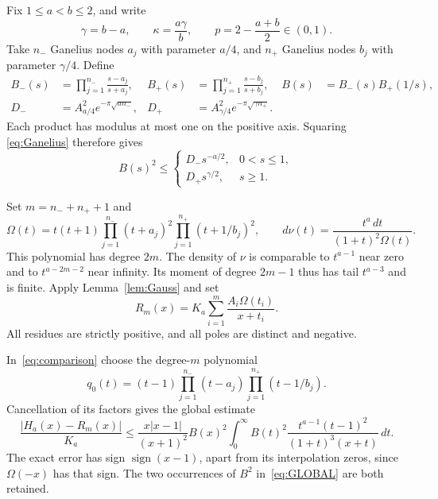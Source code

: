 \documentclass[11pt]{article}
\numberwithin{equation}{section}
\begin{document}
Fix $1\le a<b\le2$, and write
\[
 \gamma=b-a,\qquad \kappa=\frac{a\gamma}{b},\qquad
 p=2-\frac{a+b}{2}\in(0,1).
\]
Take $n_-$ Ganelius nodes $a_j$ with parameter $a/4$, and $n_+$
Ganelius nodes $b_j$ with parameter $\gamma/4$. Define
\begin{align}\label{eq:Bcombined}
 B_-(s)&=\prod_{j=1}^{n_-}\frac{s-a_j}{s+a_j},&
 B_+(s)&=\prod_{j=1}^{n_+}\frac{s-b_j}{s+b_j},&
 B(s)&=B_-(s)B_+(1/s),\\
 D_-&=A_{a/4}^2e^{-\pi\sqrt{a n_-}},&
 D_+&=A_{\gamma/4}^2e^{-\pi\sqrt{\gamma n_+}}.\nonumber
\end{align}
Each product has modulus at most one on the positive axis. Squaring
\eqref{eq:Ganelius} therefore gives
\begin{equation}\label{eq:envelopes}
 B(s)^2\le
 \begin{cases}D_-s^{-a/2},&0<s\le1,\\
 D_+s^{\gamma/2},&s\ge1.
 \end{cases}
\end{equation}

Set $m=n_-+n_++1$ and
\begin{equation}\label{eq:OmegaC1}
 \Omega(t)=t(t+1)\prod_{j=1}^{n_-}(t+a_j)^2
                         \prod_{j=1}^{n_+}(t+1/b_j)^2,
 \qquad d\nu(t)=\frac{t^a\,dt}{(1+t)^2\Omega(t)}.
\end{equation}
This polynomial has degree $2m$. The density of $\nu$ is comparable
to $t^{a-1}$ near zero and to $t^{a-2m-2}$ near infinity.
Its moment of degree $2m-1$ thus has tail $t^{a-3}$ and is finite.
Apply Lemma~\ref{lem:Gauss} and set
\begin{equation}\label{eq:RC1}
 R_m(x)=K_a\sum_{i=1}^m\frac{A_i\Omega(t_i)}{x+t_i}.
\end{equation}
All residues are strictly positive, and all poles are distinct and negative.

In~\eqref{eq:comparison} choose the degree-$m$ polynomial
\[
 q_0(t)=(t-1)\prod_{j=1}^{n_-}(t-a_j)
                     \prod_{j=1}^{n_+}(t-1/b_j).
\]
Cancellation of its factors gives the global estimate
\begin{equation}\label{eq:GLOBAL}
 \frac{|H_a(x)-R_m(x)|}{K_a}
 \le\frac{x|x-1|}{(x+1)^2}B(x)^2
   \int_0^\infty B(t)^2
      \frac{t^{a-1}(t-1)^2}{(1+t)^3(x+t)}\,dt.
\end{equation}
The exact error has sign $\operatorname{sign}(x-1)$, apart from its
interpolation zeros, since $\Omega(-x)$ has that sign.
The two occurrences of $B^2$ in~\eqref{eq:GLOBAL} are both retained.
\end{document}
